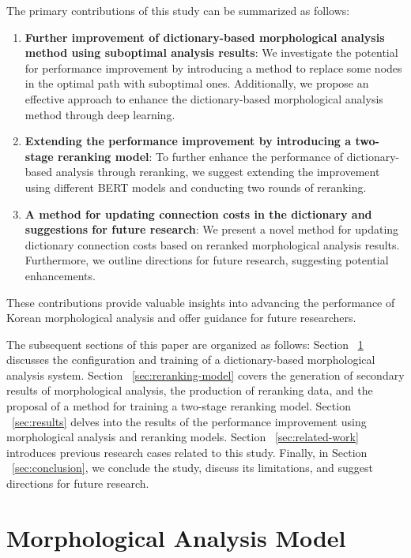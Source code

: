 \documentclass[AMS,STIX2COL]{WileyNJD-v2}
\begin{document}
    The primary contributions of this study can be summarized as follows:
    \begin{enumerate}
        \item \textbf{Further improvement of dictionary-based morphological analysis method using suboptimal analysis results}: We investigate the potential for performance improvement by introducing a method to replace some nodes in the optimal path with suboptimal ones. Additionally, we propose an effective approach to enhance the dictionary-based morphological analysis method through deep learning.
        \item \textbf{Extending the performance improvement by introducing a two-stage reranking model}: To further enhance the performance of dictionary-based analysis through reranking, we suggest extending the improvement using different BERT models and conducting two rounds of reranking.
        \item \textbf{A method for updating connection costs in the dictionary and suggestions for future research}: We present a novel method for updating dictionary connection costs based on reranked morphological analysis results. Furthermore, we outline directions for future research, suggesting potential enhancements.
    \end{enumerate}
    These contributions provide valuable insights into advancing the performance of Korean morphological analysis and offer guidance for future researchers.

    The subsequent sections of this paper are organized as follows:
    Section ~\ref{sec:morphological-analysis-model} discusses the configuration and training of a dictionary-based morphological analysis system.
    Section ~\ref{sec:reranking-model} covers the generation of secondary results of morphological analysis, the production of reranking data, and the proposal of a method for training a two-stage reranking model.
    Section ~\ref{sec:results} delves into the results of the performance improvement using morphological analysis and reranking models.
    Section ~\ref{sec:related-work} introduces previous research cases related to this study.
    Finally, in Section ~\ref{sec:conclusion}, we conclude the study, discuss its limitations, and suggest directions for future research.


    \section{Morphological Analysis Model}\label{sec:morphological-analysis-model}
\end{document}
